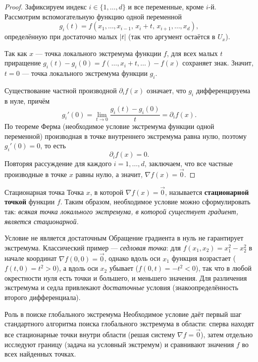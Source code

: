 \begin{proof}
	Зафиксируем индекс $i\in\{1,\dots,d\}$ и все переменные, кроме $i$-й. Рассмотрим
	вспомогательную функцию одной переменной
	\[
	g_i(t)=f(x_1,\dots,x_{i-1},\,x_i+t,\,x_{i+1},\dots,x_d),
	\]
	определённую при достаточно малых $|t|$ (так что аргумент остаётся в $U_x$).

	Так как $x$ --- точка локального экстремума функции $f$, для всех малых $t$
	приращение $g_i(t)-g_i(0)=f(\dots,x_i+t,\dots)-f(x)$ сохраняет знак. Значит, $t=0$ ---
	точка локального экстремума функции $g_i$.

	Существование частной производной $\partial_i f(x)$ означает, что $g_i$
	дифференцируема в нуле, причём
	\[
	g_i'(0)=\lim_{t\to0}\frac{g_i(t)-g_i(0)}{t}=\partial_i f(x).
	\]
	По теореме Ферма (необходимое условие экстремума функции одной переменной)
	производная в точке внутреннего экстремума равна нулю, поэтому $g_i'(0)=0$, то есть
	\[
	\partial_i f(x)=0.
	\]
	Повторяя рассуждение для каждого $i=1,\dots,d$, заключаем, что все частные
	производные в точке $x$ равны нулю, а значит, $\nabla f(x)=\vec 0$.
\end{proof}

\begin{Definition}{Стационарная точка}{}
	Точка $x$, в которой $\nabla f(x)=\vec 0$, называется \textbf{стационарной точкой}
	функции $f$. Таким образом, необходимое условие можно сформулировать так:
	\emph{всякая точка локального экстремума, в которой существует градиент, является
	стационарной.}
\end{Definition}

\begin{Remark}{Условие не является достаточным}{}
	Обращение градиента в нуль не гарантирует экстремума. Классический пример --- 
	\emph{седловая точка}: для $f(x_1,x_2)=x_1^2-x_2^2$ в начале координат
	$\nabla f(0,0)=\vec 0$, однако вдоль оси $x_1$ функция возрастает
	($f(t,0)=t^2>0$), а вдоль оси $x_2$ убывает ($f(0,t)=-t^2<0$), так что в любой
	окрестности нуля есть точки и большего, и меньшего значения. Для различения
	экстремума и седла привлекают \emph{достаточные} условия (знакоопределённость
	второго дифференциала).
\end{Remark}

\begin{Remark}{Роль в поиске глобального экстремума}{}
	Необходимое условие даёт первый шаг стандартного алгоритма поиска глобального
	экстремума в области: сперва находят все стационарные точки внутри области (решая
	систему $\nabla f=\vec 0$), затем отдельно исследуют границу (задача на условный
	экстремум) и сравнивают значения $f$ во всех найденных точках.
\end{Remark}
